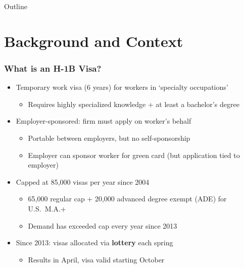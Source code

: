 \documentclass[xcolor=dvipsnames, compress, 12pt, aspectratio=169, presentation]{beamer}
\begin{document}
\begin{frame}[plain]{Outline}
    \tableofcontents
    \addtocounter{framenumber}{-1}
\end{frame}



\section{Background and Context}
\begin{frame}
    \frametitle{What is an H-1B Visa?}
    \begin{itemize}
        \item Temporary work visa (6 years) for workers in `specialty occupations'
        \begin{itemize}
            \item Requires highly specialized knowledge + at least a bachelor's degree
        \end{itemize}
        \vspace{3mm}
        \item Employer-sponsored: firm must apply on worker's behalf
        \begin{itemize}
            \item Portable between employers, but no self-sponsorship
            \item Employer can sponsor worker for green card (but application tied to employer)
        \end{itemize}
        \vspace{3mm}
        \item Capped at 85,000 visas per year since 2004
        \begin{itemize}
            \item 65,000 regular cap + 20,000 advanced degree exempt (ADE) for U.S.\ M.A.+
            \item Demand has exceeded cap every year since 2013
        \end{itemize}
        \vspace{3mm}
        \item Since 2013: visas allocated via \textbf{lottery} each spring
        \begin{itemize}
            \item Results in April, visa valid starting October
        \end{itemize}
    \end{itemize}
\end{frame}
\end{document}
